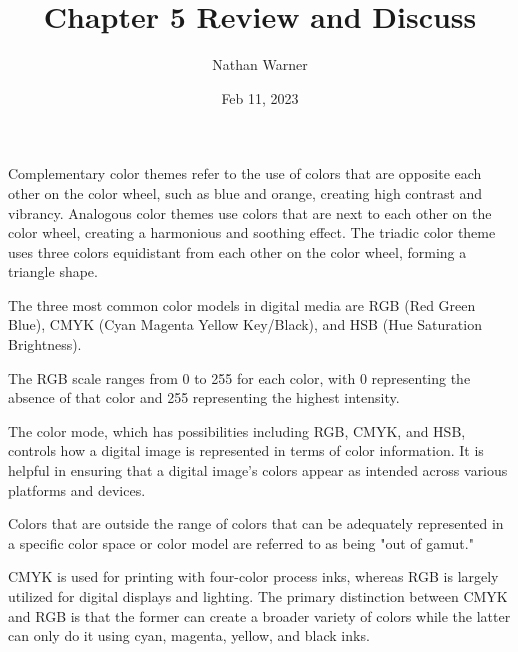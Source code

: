 \documentclass{report}
\title{\Huge{Chapter 5 Review and Discuss}}
\author{\huge{Nathan Warner}}
\date{\huge{Feb 11, 2023}}
\begin{document}
    \maketitle

    \bigbreak \noindent 
Complementary color themes refer to the use of colors that are opposite each other on the color wheel, such as blue and orange, creating high contrast and vibrancy. Analogous color themes use colors that are next to each other on the color wheel, creating a harmonious and soothing effect. The triadic color theme uses three colors equidistant from each other on the color wheel, forming a triangle shape.

    \bigbreak \noindent \bigbreak \noindent 
    \bigbreak \noindent 
The three most common color models in digital media are RGB (Red Green Blue), CMYK (Cyan Magenta Yellow Key/Black), and HSB (Hue Saturation Brightness).

    \bigbreak \noindent \bigbreak \noindent 
    \bigbreak \noindent 
    The RGB scale ranges from 0 to 255 for each color, with 0 representing the absence of that color and 255 representing the highest intensity.

    \bigbreak \noindent \bigbreak \noindent 
    \bigbreak \noindent 
    The color mode, which has possibilities including RGB, CMYK, and HSB, controls how a digital image is represented in terms of color information. It is helpful in ensuring that a digital image's colors appear as intended across various platforms and devices.

    \bigbreak \noindent \bigbreak \noindent 
    \bigbreak \noindent 
    Colors that are outside the range of colors that can be adequately represented in a specific color space or color model are referred to as being "out of gamut."

    \bigbreak \noindent \bigbreak \noindent 
    \bigbreak \noindent 
    CMYK is used for printing with four-color process inks, whereas RGB is largely utilized for digital displays and lighting. The primary distinction between CMYK and RGB is that the former can create a broader variety of colors while the latter can only do it using cyan, magenta, yellow, and black inks.
\end{document}
